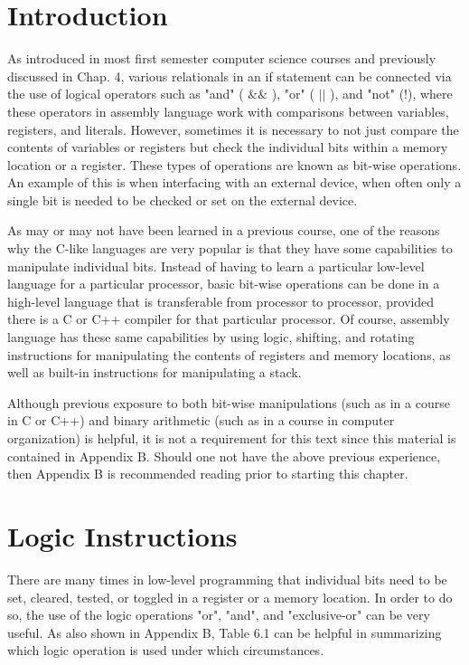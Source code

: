 \documentclass[10pt]{book}
\begin{document}
\section{Introduction}
As introduced in most first semester computer science courses and previously discussed in Chap. 4, various relationals in an if statement can be connected via the use of logical operators such as "and" ( $\& \&$ ), "or" ( $|\mid$ ), and "not" (!), where these operators in assembly language work with comparisons between variables, registers, and literals. However, sometimes it is necessary to not just compare the contents of variables or registers but check the individual bits within a memory location or a register. These types of operations are known as bit-wise operations. An example of this is when interfacing with an external device, when often only a single bit is needed to be checked or set on the external device.

As may or may not have been learned in a previous course, one of the reasons why the C-like languages are very popular is that they have some capabilities to manipulate individual bits. Instead of having to learn a particular low-level language for a particular processor, basic bit-wise operations can be done in a high-level language that is transferable from processor to processor, provided there is a C or C++ compiler for that particular processor. Of course, assembly language has these same capabilities by using logic, shifting, and rotating instructions for manipulating the contents of registers and memory locations, as well as built-in instructions for manipulating a stack.

Although previous exposure to both bit-wise manipulations (such as in a course in C or C++) and binary arithmetic (such as in a course in computer organization) is helpful, it is not a requirement for this text since this material is contained in Appendix B. Should one not have the above previous experience, then Appendix B is recommended reading prior to starting this chapter.

\section{Logic Instructions}
There are many times in low-level programming that individual bits need to be set, cleared, tested, or toggled in a register or a memory location. In order to do so, the use of the logic operations "or", "and", and "exclusive-or" can be very useful. As also shown in Appendix B, Table 6.1 can be helpful in summarizing which logic operation is used under which circumstances.
\end{document}

